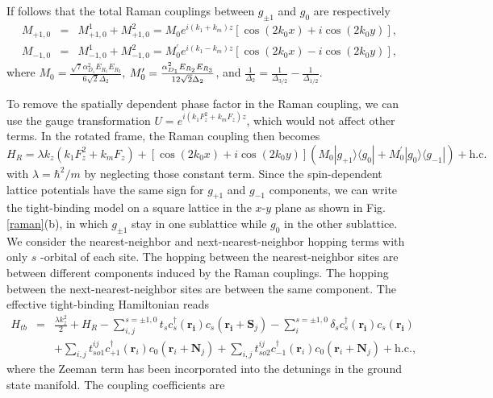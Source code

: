 \documentclass[aps,prl,floatfix,twocolumn,reprint]{revtex4}
\begin{document}
If follows that the total Raman couplings between $g_{\pm 1}$ and $g_{0}$
are respectively
\begin{eqnarray}
M_{+1,0} &=&M_{+1,0}^{1}+M_{+1,0}^{2}=M_{0}e^{i(k_{1}+k_{m})z}[\cos
(2k_{0}x)+i\cos (2k_{0}y)], \\
M_{-1,0} &=&M_{-1,0}^{1}+M_{-1,0}^{2}=M_{0}^{\prime
}e^{i(k_{1}-k_{m})z}[\cos (2k_{0}x)-i\cos (2k_{0}y)],
\end{eqnarray}%
where $M_{0}=\frac{\sqrt{7}\alpha _{D_{1}}^{2}E_{R_{1}}E_{R_{2}}}{6\sqrt{2}%
\Delta _{2}}$, $M_{0}^{\prime }=\frac{\alpha _{D_{1}}^{2}E_{R_{2}}E_{R_{3}}}{%
12\sqrt{2}\Delta _{2}}$, and $\frac{1}{\Delta _{2}}=\frac{1}{\Delta _{3/2}}-%
\frac{1}{\Delta _{1/2}}$.

To remove the spatially dependent phase factor in the Raman coupling, we can
use the gauge transformation $U=e^{i(k_{1}F_{z}^{2}+k_{m}F_{z})z}$, which
would not affect other terms. In the rotated frame, the Raman coupling then
becomes
\begin{equation}
H_{R}=\lambda k_{z}(k_{1}F_{z}^{2}+k_{m}F_{z})+[\cos (2k_{0}x)+i\cos
(2k_{0}y)](M_{0}|g_{+1}\rangle \langle g_{0}|+M_{0}^{\prime }|g_{0}\rangle
\langle g_{-1}|)+\mbox{h.c.}
\end{equation}%
with $\lambda =\hbar ^{2}/m$ by neglecting those constant term. Since the
spin-dependent lattice potentials have the same sign for $g_{+1}$ and $g_{-1}
$ components, we can write the tight-binding model on a square lattice in
the $x$-$y$ plane as shown in Fig. \ref{raman}(b), in which $g_{\pm 1}$ stay
in one sublattice while $g_{0}$ in the other sublattice. We consider the
nearest-neighbor and next-nearest-neighbor hopping terms with only $s$%
-orbital of each site. The hopping between the nearest-neighbor sites are
between different components induced by the Raman couplings. The hopping
between the next-nearest-neighbor sites are between the same component. The
effective tight-binding Hamiltonian reads
\begin{eqnarray}
H_{tb} &=&\frac{\lambda k_{z}^{2}}{2}+H_{R}-\sum_{i,j}^{s=\pm
1,0}t_{s}c_{s}^{\dag }(\bm{r_{i}})c_{s}(\bm{r_{i}}+\bm{S}_{j})-\sum_{i}^{s=%
\pm 1,0}\delta _{s}c_{s}^{\dag }(\bm{r_{i}})c_{s}(\bm{r_{i}}) \\
&&+\sum_{i,j}t_{so1}^{ij}c_{+1}^{\dag }(\bm{r}_{i})c_{0}(\bm{r}_{i}+\bm{N}%
_{j})+\sum_{i,j}t_{so2}^{ij}c_{-1}^{\dag }(\bm{r}_{i})c_{0}(\bm{r}_{i}+\bm{N}%
_{j})+\mbox{h.c.},
\end{eqnarray}%
where the Zeeman term has been incorporated into the detunings in the ground
state manifold. The coupling coefficients are
\end{document}
